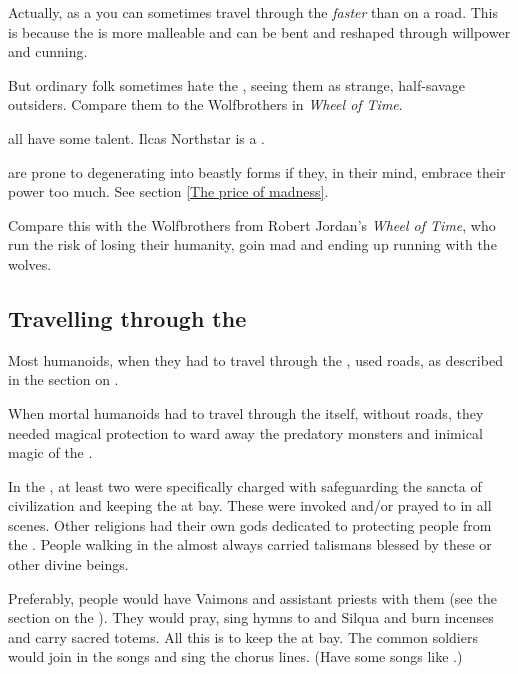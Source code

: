 Actually, as a \ranger{} you can sometimes travel through the \Wylde{} \emph{faster} than on a road. This is because the \Wylde{} is more malleable and can be bent and reshaped through willpower and cunning. 

But ordinary folk sometimes hate the \rangers{}, seeing them as strange, half-savage outsiders. Compare them to the Wolfbrothers in \emph{Wheel of Time}. 

\Nycaneers{} all have some \ranger{} talent. Ilcas Northstar is a \ranger. 

\Rangers{} are prone to degenerating into beastly forms if they, in their mind, embrace their \Wylde{} power too much. See section \ref{The price of madness}. 

Compare this with the Wolfbrothers from Robert Jordan's \emph{Wheel of Time}, who run the risk of losing their humanity, goin mad and ending up running with the wolves.







\subsection{Travelling through the \Wylde}
Most humanoids, when they had to travel through the \wylde, used roads, as described in the section on . 

When mortal humanoids had to travel through the \wylde itself, without roads, they needed magical protection to ward away the predatory monsters and inimical magic of the \wylde. 

In the , at least two \sephiroth were specifically charged with safeguarding the sancta of civilization and keeping the \wylde at bay.
These were invoked and/or prayed to in all \wylde scenes.
Other religions had their own gods dedicated to protecting people from the \wylde. 
People walking in the \wylde almost always carried \wylde talismans blessed by these \sephiroth or other divine beings.

Preferably, people would have Vaimons and assistant priests with them (see the section on the ).
They would pray, sing hymns to \Iquin and Silqua and burn incenses and carry sacred totems.
All this is to keep the \wylde at bay.
The common soldiers would join in the songs and sing the chorus lines.
(Have some songs like .)

